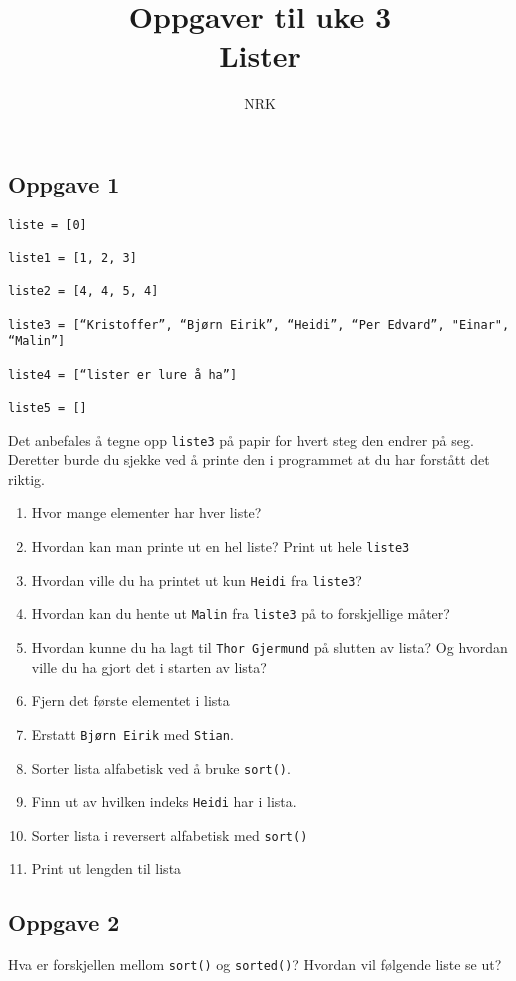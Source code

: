 \documentclass{article}
\title{Oppgaver til uke 3 \\ Lister}
\author{NRK}
\date{}
\begin{document}
\maketitle
\noindent

\subsection*{Oppgave 1}
\begin{verbatim}
liste = [0]

liste1 = [1, 2, 3]

liste2 = [4, 4, 5, 4]

liste3 = [“Kristoffer”, “Bjørn Eirik”, “Heidi”, “Per Edvard”, "Einar", “Malin”]

liste4 = [“lister er lure å ha”]

liste5 = []  
\end{verbatim}
Det anbefales å tegne opp \texttt{liste3} på papir for hvert steg den endrer på seg. Deretter burde du sjekke ved å printe den i programmet at du har forstått det riktig.
\begin{enumerate}
    \item Hvor mange elementer har hver liste?
    \item Hvordan kan man printe ut en hel liste? Print ut hele \texttt{liste3}
    \item Hvordan ville du ha printet ut kun \texttt{Heidi} fra \texttt{liste3}?
    \item Hvordan kan du hente ut \texttt{Malin} fra  \texttt{liste3} på to forskjellige måter?
    \item Hvordan kunne du ha lagt til \texttt{Thor Gjermund} på slutten av lista? Og hvordan ville du ha gjort det i starten av lista?
    \item Fjern det første elementet i lista
    \item Erstatt \texttt{Bjørn Eirik} med \texttt{Stian}.
    \item Sorter lista alfabetisk ved å bruke \texttt{sort()}.
    \item Finn ut av hvilken indeks \texttt{Heidi} har i lista.
    \item Sorter lista i reversert alfabetisk med \texttt{sort()}
    \item Print ut lengden til lista
\end{enumerate}

\subsection*{Oppgave 2}
Hva er forskjellen mellom \texttt{sort()} og \texttt{sorted()}? Hvordan vil følgende liste se ut?
\end{document}

